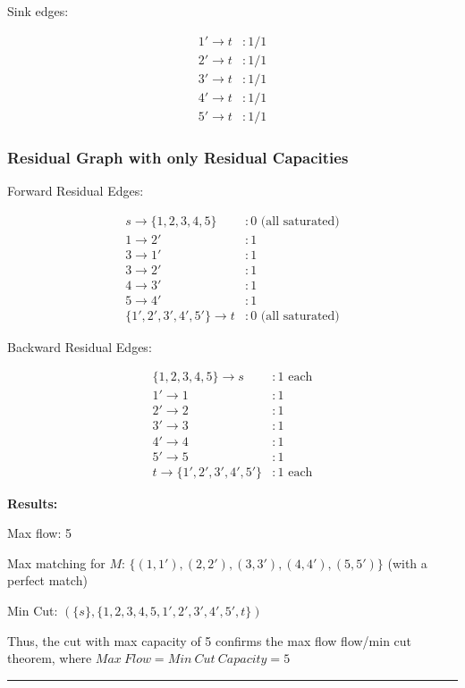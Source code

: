 \documentclass[
]{article}
\begin{document}
Sink edges:

\[
\begin{align} 1' \to t &: 1/1 \\
 2' \to t &: 1/1 \\
3' \to t &: 1/1 \\
 4' \to t &: 1/1 \\
5' \to t &: 1/1
\end{align}
\]

\subsubsection{Residual Graph with only Residual
Capacities}\label{residual-graph-with-only-residual-capacities}

Forward Residual Edges:

\[
\begin{align} s \to \{1, 2, 3, 4, 5\} &: 0 \text{ (all saturated)}  \\
1 \to 2' &: 1 \\
 3 \to 1' &: 1 \\
 3 \to 2' &: 1 \\
 4 \to 3' &: 1 \\
 5 \to 4' &: 1 \\
 \{1', 2', 3', 4', 5'\} \to t &: 0 \text{ (all saturated)} \end{align}
\]

Backward Residual Edges:

\[
\begin{align} \{1, 2, 3, 4, 5\} \to s &: 1 \text{ each} \\
 1' \to 1 &: 1 \\
 2' \to 2 &: 1 \\
 3' \to 3 &: 1 \\
 4' \to 4 &: 1 \\
 5' \to 5 &: 1 \\
 t \to \{1', 2', 3', 4', 5'\} &: 1 \text{ each} \end{align}
\]

\textbf{Results:}

Max flow: 5

Max matching for \(M\): \(\{ (1,1'), (2,2'), (3,3'), (4,4'), (5,5') \}\)
(with a perfect match)

Min Cut: \((\{ s \}, \{ 1,2,3,4,5,1',2',3',4',5',t \})\)

Thus, the cut with max capacity of 5 confirms the max flow flow/min cut
theorem, where \(Max\ Flow = Min\ Cut\ Capacity =5\)

\begin{center}\rule{0.5\linewidth}{0.5pt}\end{center}
\end{document}
